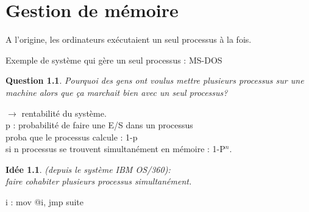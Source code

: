 \documentclass[12pt,a4paper]{report}
\newtheorem*{q}{Question}
\newtheorem*{id}{Idée}
\begin{document}
\chapter{Gestion de mémoire}

A l'origine, les ordinateurs exécutaient un seul processus à la fois.

\begin{center}
\end{center}
Exemple de système qui gère un seul processus : MS-DOS\\

\begin{q}Pourquoi des gens ont voulus mettre plusieurs processus sur une machine alors que ça marchait bien avec un seul processus?\end{q}
$\longrightarrow$ rentabilité du système.\\

p : probabilité de faire une E/S dans un processus\\
proba que le processus calcule : 1-p\\
si n processus se trouvent simultanément en mémoire : 1-P$^n$.\\

\begin{id} (depuis le système IBM OS/360):\\
faire cohabiter plusieurs processus simultanément.
\end{id}

\begin{center}
\end{center}
\begin{verbatimtab}
 i :
 mov @i, %
 jmp suite
\end{verbatimtab}
\end{document}
